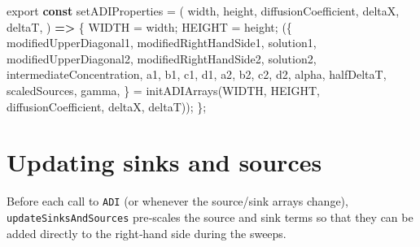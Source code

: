 \documentclass[
  letterpaper,
  DIV=11,
  numbers=noendperiod]{scrreprt}
\newenvironment{Shaded}{\begin{snugshade}}{\end{snugshade}}
\newcommand{\FunctionTok}[1]{\textcolor[rgb]{0.28,0.35,0.67}{#1}}
\newcommand{\ImportTok}[1]{\textcolor[rgb]{0.00,0.46,0.62}{#1}}
\newcommand{\KeywordTok}[1]{\textcolor[rgb]{0.00,0.23,0.31}{\textbf{#1}}}
\newcommand{\NormalTok}[1]{\textcolor[rgb]{0.00,0.23,0.31}{#1}}
\newcommand{\OperatorTok}[1]{\textcolor[rgb]{0.37,0.37,0.37}{#1}}
\begin{document}
\label{adi-set-properties}%
\begin{Shaded}
\begin{Highlighting}[]
\ImportTok{export} \KeywordTok{const}\NormalTok{ setADIProperties }\OperatorTok{=}\NormalTok{ (}
\NormalTok{    width}\OperatorTok{,}
\NormalTok{    height}\OperatorTok{,}
\NormalTok{    diffusionCoefficient}\OperatorTok{,}
\NormalTok{    deltaX}\OperatorTok{,}
\NormalTok{    deltaT}\OperatorTok{,}
\NormalTok{) }\KeywordTok{=\textgreater{}}\NormalTok{ \{}
\NormalTok{    WIDTH }\OperatorTok{=}\NormalTok{ width}\OperatorTok{;}
\NormalTok{    HEIGHT }\OperatorTok{=}\NormalTok{ height}\OperatorTok{;}
\NormalTok{    (\{}
\NormalTok{        modifiedUpperDiagonal1}\OperatorTok{,}
\NormalTok{        modifiedRightHandSide1}\OperatorTok{,}
\NormalTok{        solution1}\OperatorTok{,}
\NormalTok{        modifiedUpperDiagonal2}\OperatorTok{,}
\NormalTok{        modifiedRightHandSide2}\OperatorTok{,}
\NormalTok{        solution2}\OperatorTok{,}
\NormalTok{        intermediateConcentration}\OperatorTok{,}
\NormalTok{        a1}\OperatorTok{,}
\NormalTok{        b1}\OperatorTok{,}
\NormalTok{        c1}\OperatorTok{,}
\NormalTok{        d1}\OperatorTok{,}
\NormalTok{        a2}\OperatorTok{,}
\NormalTok{        b2}\OperatorTok{,}
\NormalTok{        c2}\OperatorTok{,}
\NormalTok{        d2}\OperatorTok{,}
\NormalTok{        alpha}\OperatorTok{,}
\NormalTok{        halfDeltaT}\OperatorTok{,}
\NormalTok{        scaledSources}\OperatorTok{,}
\NormalTok{        gamma}\OperatorTok{,}
\NormalTok{    \} }\OperatorTok{=} \FunctionTok{initADIArrays}\NormalTok{(WIDTH}\OperatorTok{,}\NormalTok{ HEIGHT}\OperatorTok{,}\NormalTok{ diffusionCoefficient}\OperatorTok{,}\NormalTok{ deltaX}\OperatorTok{,}\NormalTok{ deltaT))}\OperatorTok{;}
\NormalTok{\}}\OperatorTok{;}
\end{Highlighting}
\end{Shaded}

\section{Updating sinks and sources}\label{updating-sinks-and-sources}

Before each call to \texttt{ADI} (or whenever the source/sink arrays
change), \texttt{updateSinksAndSources} pre‑scales the source and sink
terms so that they can be added directly to the right‑hand side during
the sweeps.
\end{document}
